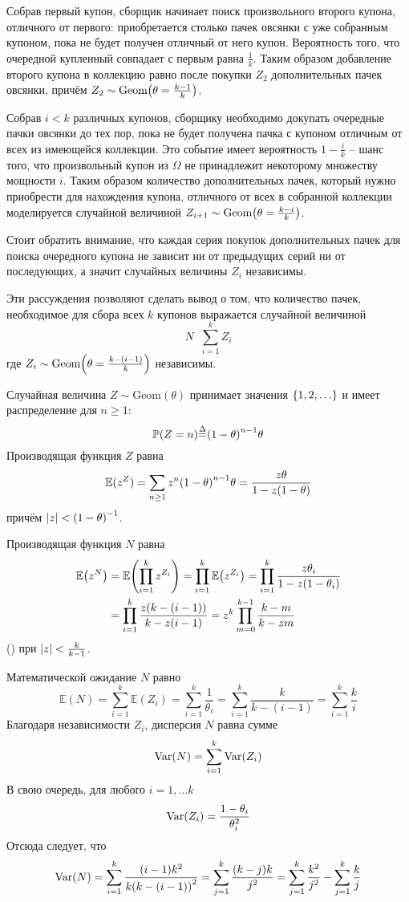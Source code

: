 \documentclass[a4paper]{article}
\let\originalleft\left
\let\originalright\right
\renewcommand{\left}{\mathopen{}\mathclose\bgroup\originalleft}
\renewcommand{\right}{\aftergroup\egroup\originalright}
\newcommand{\obj}[1]{{\left\{ #1 \right \}}}
\newcommand{\brac}[1]{{\left ( #1 \right )}}
\newcommand{\abs}[1]{{\left | #1 \right |}}
\newcommand{\Ex}[0]{{\mathbb{E}}}
\newcommand{\pr}[0]{{\mathbb{P}}}
\newcommand{\Var}[1]{{\text{Var}\brac{#1}}}
\newcommand{\defn}{{\mathop{\overset{\Delta}{=}}\nolimits}}
\begin{document}
Собрав первый купон, сборщик начинает поиск произвольного второго купона,
отличного от первого: приобретается столько пачек овсянки с уже собранным
купоном, пока не будет получен отличный от него купон.
Вероятность того, что очередной купленный совпадает с первым равна
$\frac{1}{k}$.
Таким образом добавление второго купона в коллекцию равно после покупки $Z_2$
дополнительных пачек овсянки, причём
$Z_2\sim \text{Geom}\brac{\theta=\frac{k-1}{k}}$.

Собрав $i<k$ различных купонов, сборщику необходимо докупать очередные пачки
овсянки до тех пор, пока не будет получена пачка с купоном отличным от всех из
имеющейся коллекции.
Это событие имеет вероятность $1-\frac{i}{k}$ -- шанс того, что произвольный
купон из $\Omega$ не принадлежит некоторому множеству мощности $i$.
Таким образом количество дополнительных пачек, который нужно приобрести для
нахождения купона, отличного от всех в собранной коллекции моделируется
случайной величиной $Z_{i+1}\sim \text{Geom}\brac{\theta=\frac{k-i}{k}}$.

Стоит обратить внимание, что каждая серия покупок дополнительных пачек для
поиска очередного купона не зависит ни от предыдущих серий ни от последующих,
а значит случайных величины $Z_i$ независимы.

Эти рассуждения позволяют сделать вывод о том, что количество пачек,
необходимое для сбора всех $k$ купонов выражается случайной величиной
\[N\defn \sum_{i=1}^k Z_i\]
где $Z_i\sim \text{Geom}\brac{\theta = \frac{k-(i-1)}{k}}$ независимы.

Случайная величина $Z\sim\text{Geom}(\theta)$ принимает значения
$\obj{1,2,\ldots}$ и имеет распределение для $n\geq 1$:
\[\pr(Z=n) \defn \brac{1-\theta}^{n-1} \theta\]
Производящая функция $Z$ равна
\[\Ex(z^Z) = \sum_{n\geq1} z^n \brac{1-\theta}^{n-1} \theta
= \frac{z\theta}{1-z(1-\theta)} \]
причём $\abs{z}<\brac{1-\theta}^{-1}$.

Производящая функция $N$ равна \begin{align*}
	\Ex\brac{z^N}
	&= \Ex\brac{\prod_{i=1}^k z^{Z_i}}
		= \prod_{i=1}^k \Ex\brac{z^{Z_i}}
		= \prod_{i=1}^k \frac{z\theta_i}{1-z(1-\theta_i)} \\
		& = \prod_{i=1}^k \frac{z \brac{k-(i-1)}}{k - z (i-1)}
		= z^k \prod_{m=0}^{k-1} \frac{k-m}{k - z m}
\end{align*}()
при $\abs{z}<\frac{k}{k-1}$.

Математической ожидание $N$ равно
\[\Ex(N) = \sum_{i=1}^k \Ex(Z_i) = \sum_{i=1}^k \frac{1}{\theta_i}
= \sum_{i=1}^k \frac{k}{k-(i-1)} = \sum_{i=1}^k \frac{k}{i} \]
Благодаря независимости $Z_i$, дисперсия $N$ равна сумме
\[\Var{N} = \sum_{i=1}^k \Var{Z_i}\]
В свою очередь, для любого $i=1,\ldots k$
\[\Var{Z_i} = \frac{1-\theta_i}{\theta_i^2}\]
Отсюда следует, что
\[\Var{N} = \sum_{i=1}^k \frac{(i-1) k^2}{k \brac{k-(i-1)}^2}
	= \sum_{j=1}^k \frac{(k-j) k}{j^2}
	= \sum_{j=1}^k \frac{k^2}{j^2} - \sum_{j=1}^k \frac{k}{j}\]
\end{document}
